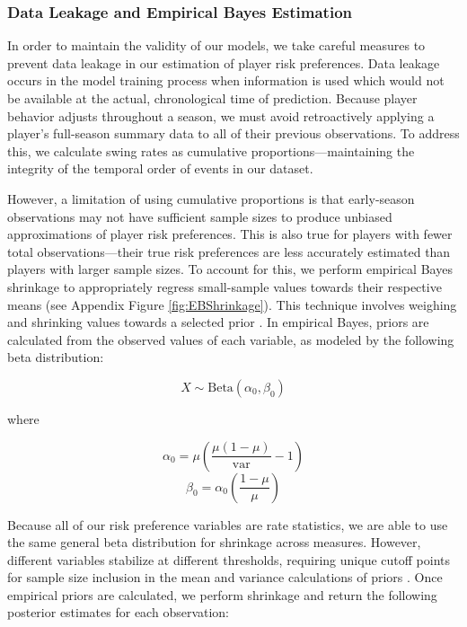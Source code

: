 \documentclass[12pt]{article}
\numberwithin{equation}{section}
\begin{document}
\subsubsection{Data Leakage and Empirical Bayes Estimation}

In order to maintain the validity of our models, we take careful measures to prevent data leakage in our estimation of player risk preferences. Data leakage occurs in the model training process when information is used which would not be available at the actual, chronological time of prediction. Because player behavior adjusts throughout a season, we must avoid retroactively applying a player’s full-season summary data to all of their previous observations. To address this, we calculate swing rates as cumulative proportions---maintaining the integrity of the temporal order of events in our dataset.

\vspace{5mm} %

However, a limitation of using cumulative proportions is that early-season observations may not have sufficient sample sizes to produce unbiased approximations of player risk preferences. This is also true for players with fewer total observations---their true risk preferences are less accurately estimated than players with larger sample sizes. To account for this, we perform empirical Bayes shrinkage to appropriately regress small-sample values towards their respective means (see Appendix Figure \ref{fig:EBShrinkage}). This technique involves weighing and shrinking values towards a selected prior \parencite{martin_shrinkage_2018}. In empirical Bayes, priors are calculated from the observed values of each variable, as modeled by the following beta distribution:

\begin{equation}
X \sim \text{Beta}(\alpha_0, \beta_0)
\end{equation}

where

\begin{equation}
\alpha_0 = \mu \left(\frac{\mu(1-\mu)}{\text{var}} - 1\right)
\end{equation}
\begin{equation}
\beta_0 = \alpha_0 \left(\frac{1-\mu}{\mu}\right)
\end{equation}

\vspace{5mm} %

Because all of our risk preference variables are rate statistics, we are able to use the same general beta distribution for shrinkage across measures. However, different variables stabilize at different thresholds, requiring unique cutoff points for sample size inclusion in the mean and variance calculations of priors \parencite{slowinski10}. Once empirical priors are calculated, we perform shrinkage and return the following posterior estimates for each observation:
\end{document}
